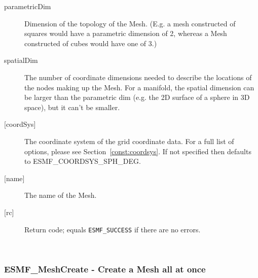      \begin{description}
     \item [parametricDim]
           Dimension of the topology of the Mesh. (E.g. a mesh constructed of squares would
           have a parametric dimension of 2, whereas a Mesh constructed of cubes would have one
           of 3.)
     \item[spatialDim]
           The number of coordinate dimensions needed to describe the locations of the nodes
           making up the Mesh. For a manifold, the spatial dimension can be larger than the
           parametric dim (e.g. the 2D surface of a sphere in 3D space), but it can't be smaller.
   \item[{[coordSys]}]
           The coordinate system of the grid coordinate data.
           For a full list of options, please see Section~\ref{const:coordsys}.
           If not specified then defaults to ESMF\_COORDSYS\_SPH\_DEG.
     \item [{[name]}]
           The name of the Mesh.
     \item [{[rc]}]
           Return code; equals {\tt ESMF\_SUCCESS} if there are no errors.
     \end{description}
   
 
\mbox{}\hrulefill\ 
 
\subsubsection [ESMF\_MeshCreate] {ESMF\_MeshCreate - Create a Mesh all at once}


